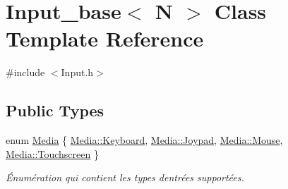 \hypertarget{class_input__base}{}\section{Input\+\_\+base$<$ N $>$ Class Template Reference}
\label{class_input__base}


{\ttfamily \#include $<$Input.\+h$>$}

\subsection*{Public Types}
\begin{DoxyCompactItemize}
\item 
enum \mbox{\hyperlink{class_input__base_a455585e7933485981b3d7bfcad3a47c6}{Media}} \{ \mbox{\hyperlink{class_input__base_a455585e7933485981b3d7bfcad3a47c6a6ce4d85a628a88bbdb3ac24a8e5a9c2e}{Media\+::\+Keyboard}}, 
\mbox{\hyperlink{class_input__base_a455585e7933485981b3d7bfcad3a47c6ad17c22e217179fc5626be9b94f1f18fa}{Media\+::\+Joypad}}, 
\mbox{\hyperlink{class_input__base_a455585e7933485981b3d7bfcad3a47c6af2a47c6809d88e175dade0ef7b16aa13}{Media\+::\+Mouse}}, 
\mbox{\hyperlink{class_input__base_a455585e7933485981b3d7bfcad3a47c6a588711541a203a16bbc517f3f73ef7c8}{Media\+::\+Touchscreen}}
 \}
\begin{DoxyCompactList}\small\item\em Énumération qui contient les types d\textquotesingle{}entrées supportées. \end{DoxyCompactList}\end{DoxyCompactItemize}
